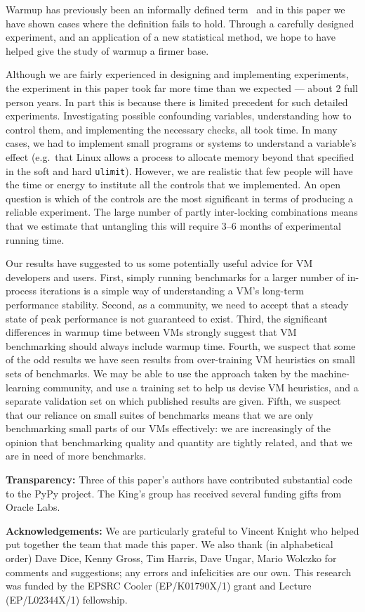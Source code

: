 \documentclass[preprint,numbers,10pt]{sigplanconf}
\begin{document}
Warmup has previously been an informally defined term~\cite{seaton15phd} and in this
paper we have shown cases where the definition fails to hold. Through a carefully
designed experiment, and an application of a new statistical method, we hope
to have helped give the study of warmup a firmer base.

Although we are fairly experienced in designing and implementing
experiments, the experiment in this paper took far more time than we expected
--- about 2 full person years. In part this is because there is limited precedent for such detailed
experiments. Investigating possible confounding variables, understanding how to
control them, and implementing the necessary checks, all took time. In many
cases, we had to implement small programs or systems to understand a variable's
effect (e.g.~that Linux allows a process to allocate memory beyond that
specified in the soft and hard \texttt{ulimit}). However, we are realistic that
few people will have the time or energy to institute all the controls that we
implemented. An open question is which of the controls are the most significant
in terms of producing a reliable experiment. The large number of partly
inter-locking combinations means that we estimate that untangling this will
require 3--6 months of experimental running time.

Our results have suggested to us some potentially useful advice for VM
developers and users. First, simply running benchmarks for a larger number of
in-process iterations is a simple way of understanding a VM's long-term
performance stability. Second, as a community, we need to accept that a steady
state of peak performance is not guaranteed to exist. Third, the significant
differences in warmup time between VMs strongly suggest that VM benchmarking
should always include warmup time. Fourth, we suspect that some of the odd
results we have seen results from over-training VM heuristics on small sets of
benchmarks. We may be able to use the approach taken by the machine-learning
community, and use a training set to help us devise VM heuristics, and a
separate validation set on which published results are given. Fifth, we suspect
that our reliance on small suites of benchmarks means that we are only
benchmarking small parts of our VMs effectively: we are increasingly of the
opinion that benchmarking quality and quantity are tightly related, and that we
are in need of more benchmarks.

\textbf{Transparency:} Three of this paper's authors have contributed
substantial code to the PyPy project. The King's group has received
several funding gifts from Oracle Labs.

\textbf{Acknowledgements:} We are particularly grateful to Vincent Knight
who helped put together the team that made this paper. We also thank (in alphabetical order) Dave Dice, Kenny
Gross, Tim Harris, Dave Ungar, Mario Wolczko for comments and suggestions; any
errors and infelicities are our own. This research was funded by the EPSRC
Cooler (EP/K01790X/1) grant and Lecture (EP/L02344X/1) fellowship.



\end{document}
